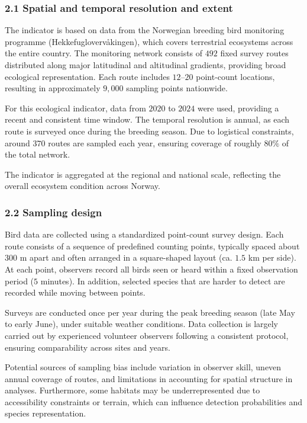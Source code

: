 \documentclass[
  letterpaper,
  DIV=11,
  numbers=noendperiod]{scrartcl}
\begin{document}
\subsubsection{2.1 Spatial and temporal resolution and
extent}\label{spatial-and-temporal-resolution-and-extent}

The indicator is based on data from the Norwegian breeding bird
monitoring programme (Hekkefuglovervåkingen), which covers terrestrial
ecosystems across the entire country. The monitoring network consists of
\(492\) fixed survey routes distributed along major latitudinal and
altitudinal gradients, providing broad ecological representation. Each
route includes \(12–20\) point-count locations, resulting in
approximately \(9,000\) sampling points nationwide.

For this ecological indicator, data from \(2020\) to \(2024\) were used,
providing a recent and consistent time window. The temporal resolution
is annual, as each route is surveyed once during the breeding season.
Due to logistical constraints, around \(370\) routes are sampled each
year, ensuring coverage of roughly \(80\%\) of the total network.

The indicator is aggregated at the regional and national scale,
reflecting the overall ecosystem condition across Norway.

\subsubsection{2.2 Sampling design}\label{sampling-design}

Bird data are collected using a standardized point-count survey design.
Each route consists of a sequence of predefined counting points,
typically spaced about 300 m apart and often arranged in a square-shaped
layout (ca. \(1.5\) km per side). At each point, observers record all
birds seen or heard within a fixed observation period (\(5\) minutes).
In addition, selected species that are harder to detect are recorded
while moving between points.

Surveys are conducted once per year during the peak breeding season
(late May to early June), under suitable weather conditions. Data
collection is largely carried out by experienced volunteer observers
following a consistent protocol, ensuring comparability across sites and
years.

Potential sources of sampling bias include variation in observer skill,
uneven annual coverage of routes, and limitations in accounting for
spatial structure in analyses. Furthermore, some habitats may be
underrepresented due to accessibility constraints or terrain, which can
influence detection probabilities and species representation.
\end{document}
